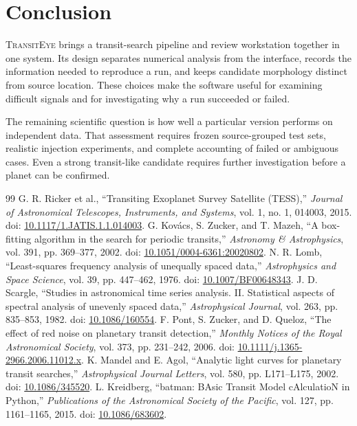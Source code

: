 \documentclass[11pt,a4paper]{article}
\newcommand{\project}{\textsc{TransitEye}}
\begin{document}
\section{Conclusion}
\project{} brings a transit-search pipeline and review workstation together in one system. Its design separates numerical analysis from the interface, records the information needed to reproduce a run, and keeps candidate morphology distinct from source location. These choices make the software useful for examining difficult signals and for investigating why a run succeeded or failed.

The remaining scientific question is how well a particular version performs on independent data. That assessment requires frozen source-grouped test sets, realistic injection experiments, and complete accounting of failed or ambiguous cases. Even a strong transit-like candidate requires further investigation before a planet can be confirmed.

\begin{thebibliography}{99}
 G. R. Ricker et al., ``Transiting Exoplanet Survey Satellite (TESS),'' \emph{Journal of Astronomical Telescopes, Instruments, and Systems}, vol. 1, no. 1, 014003, 2015. doi: \href{https://doi.org/10.1117/1.JATIS.1.1.014003}{10.1117/1.JATIS.1.1.014003}.
 G. Kov\'acs, S. Zucker, and T. Mazeh, ``A box-fitting algorithm in the search for periodic transits,'' \emph{Astronomy \& Astrophysics}, vol. 391, pp. 369--377, 2002. doi: \href{https://doi.org/10.1051/0004-6361:20020802}{10.1051/0004-6361:20020802}.
 N. R. Lomb, ``Least-squares frequency analysis of unequally spaced data,'' \emph{Astrophysics and Space Science}, vol. 39, pp. 447--462, 1976. doi: \href{https://doi.org/10.1007/BF00648343}{10.1007/BF00648343}.
 J. D. Scargle, ``Studies in astronomical time series analysis. II. Statistical aspects of spectral analysis of unevenly spaced data,'' \emph{Astrophysical Journal}, vol. 263, pp. 835--853, 1982. doi: \href{https://doi.org/10.1086/160554}{10.1086/160554}.
 F. Pont, S. Zucker, and D. Queloz, ``The effect of red noise on planetary transit detection,'' \emph{Monthly Notices of the Royal Astronomical Society}, vol. 373, pp. 231--242, 2006. doi: \href{https://doi.org/10.1111/j.1365-2966.2006.11012.x}{10.1111/j.1365-2966.2006.11012.x}.
 K. Mandel and E. Agol, ``Analytic light curves for planetary transit searches,'' \emph{Astrophysical Journal Letters}, vol. 580, pp. L171--L175, 2002. doi: \href{https://doi.org/10.1086/345520}{10.1086/345520}.
 L. Kreidberg, ``batman: BAsic Transit Model cAlculatioN in Python,'' \emph{Publications of the Astronomical Society of the Pacific}, vol. 127, pp. 1161--1165, 2015. doi: \href{https://doi.org/10.1086/683602}{10.1086/683602}.
\end{thebibliography}
\end{document}
